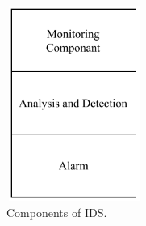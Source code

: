 \begin{figure}[tp]
\center	
\includegraphics[width=1.75in, height=2.5in] {Figures/PDF/IDS-Components.pdf}
\caption{Components of IDS.}
\label{IDS-Component}	
\end{figure}
\par

